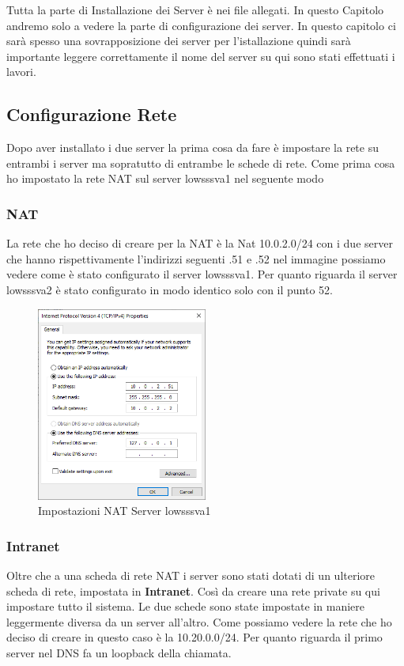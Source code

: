\documentclass[../main.tex]{subfiles}
\begin{document}
Tutta la parte di Installazione dei Server è nei file allegati. In questo Capitolo andremo solo a vedere la parte di configurazione dei server. In questo capitolo ci sarà spesso una sovrapposizione dei server per l'istallazione quindi sarà importante leggere correttamente il nome del server su qui sono stati effettuati i lavori. 
\subsection{Configurazione Rete}
Dopo aver installato i due server la prima cosa da fare è impostare la rete su entrambi i server ma sopratutto di entrambe le schede di rete.
Come prima cosa ho impostato la rete NAT sul server lowsssva1 nel seguente modo

\subsubsection{NAT}
La rete che ho deciso di creare per la NAT è  la Nat 10.0.2.0/24 con i due server che hanno rispettivamente l'indirizzi seguenti .51 e .52  nel immagine possiamo vedere come è  stato configurato il server lowsssva1. Per quanto riguarda il server  lowsssva2 è  stato configurato in modo identico solo con il punto 52.


 \begin{figure}[h]
    \centering
    \includegraphics[width=0.5\textwidth]{Images/natServer1.PNG}
    \caption{Impostazioni NAT Server lowsssva1}
\end{figure}
\pagebreak{}
\thispagestyle{header-pages}

\subsubsection{Intranet}
Oltre che a una scheda di rete NAT i server sono stati dotati di un ulteriore scheda di rete, impostata in \textbf{Intranet}. Così da creare una rete private su qui impostare tutto il sistema. Le due schede sono state impostate in maniere leggermente diversa da un server all'altro. 
Come possiamo vedere la rete che ho deciso di creare in questo caso è la 10.20.0.0/24. Per quanto riguarda il primo server nel DNS fa un loopback della chiamata.
\end{document}
